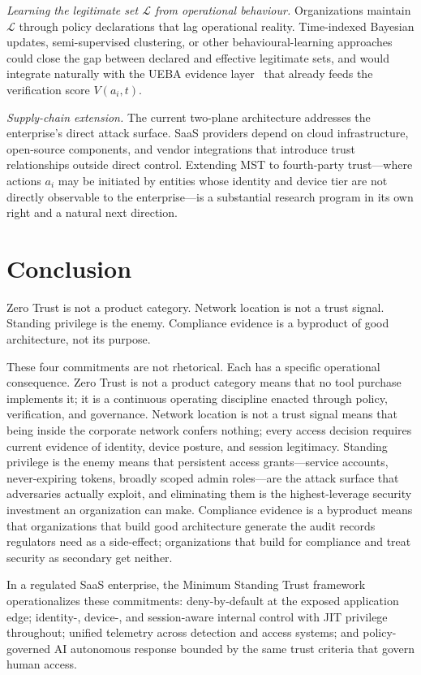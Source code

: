 \documentclass[acmlarge]{acmart}
\begin{document}
\textit{Learning the legitimate set $\mathcal{L}$ from operational
behaviour.} Organizations maintain $\mathcal{L}$ through policy
declarations that lag operational reality. Time-indexed Bayesian updates,
semi-supervised clustering, or other behavioural-learning approaches
could close the gap between declared and effective legitimate sets, and
would integrate naturally with the UEBA evidence layer~\cite{tuor2017}
that already feeds the verification score $V(a_i, t)$.

\textit{Supply-chain extension.} The current two-plane architecture
addresses the enterprise's direct attack surface. SaaS providers depend
on cloud infrastructure, open-source components, and vendor integrations
that introduce trust relationships outside direct control. Extending MST
to fourth-party trust---where actions $a_i$ may be initiated by entities
whose identity and device tier are not directly observable to the
enterprise---is a substantial research program in its own right and a
natural next direction.

\section{Conclusion}
\label{sec:conclusion}

Zero Trust is not a product category. Network location is not a trust signal.
Standing privilege is the enemy. Compliance evidence is a byproduct of good
architecture, not its purpose.

These four commitments are not rhetorical. Each has a specific operational consequence.
Zero Trust is not a product category means that no tool purchase implements it;
it is a continuous operating discipline enacted through policy, verification, and
governance. Network location is not a trust signal means that being inside the
corporate network confers nothing; every access decision requires current evidence
of identity, device posture, and session legitimacy. Standing privilege is the enemy
means that persistent access grants---service accounts, never-expiring tokens,
broadly scoped admin roles---are the attack surface that adversaries actually
exploit, and eliminating them is the highest-leverage security investment an
organization can make. Compliance evidence is a byproduct means that organizations
that build good architecture generate the audit records regulators need as a
side-effect; organizations that build for compliance and treat security as secondary
get neither.

In a regulated SaaS enterprise, the Minimum Standing Trust framework operationalizes
these commitments: deny-by-default at the exposed application edge; identity-,
device-, and session-aware internal control with JIT privilege throughout; unified
telemetry across detection and access systems; and policy-governed AI autonomous
response bounded by the same trust criteria that govern human access.
\end{document}
